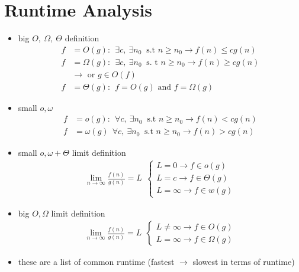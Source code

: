 \section*{Runtime Analysis} %
\begin{itemize}
    \item big $O,~ \Omega,~ \Theta$ definition 
    \begin{align*}
        f &= O(g):~~\exists c, ~ \exists n_0~\text{ s.t }  n \geq n_0 \rightarrow f(n) \leq cg(n)\\
        f &= \Omega(g):~~ \exists c, ~\exists n_0 ~ \text{ s. t } n \geq n_0 \rightarrow f(n) \geq c g(n)\\
        &\rightarrow \text{ or } g \in O(f) \\
        f &= \Theta(g): ~~ f = O(g) \text{ and } f = \Omega(g)
    \end{align*}
    \item small $o, \omega$
    \begin{align*}
        f &= o(g): ~~ \forall c, ~ \exists n_0 ~ \text{ s.t } n \geq n_0 \rightarrow f(n) < c g(n) \\
        f &= \omega(g) ~~ \forall c, ~ \exists n_0 ~ \text{ s.t } n \geq n_0 \rightarrow f(n) > c g(n)
    \end{align*}
    \item small $o, \omega + \Theta$ limit definition
    \begin{align*}
        \lim_{n \rightarrow \infty} \frac{f(n)}{g(n)} = L~~
        \begin{cases}
            L = 0 \rightarrow f \in o(g) \\
            L = c \rightarrow f \in \Theta(g) \\
            L = \infty \rightarrow f \in w(g)
        \end{cases}
    \end{align*}
    \item big $O, \Omega$ limit definition
    \begin{align*}
        \lim_{n \rightarrow \infty} \frac{f(n)}{g(n)} = L ~~
        \begin{cases}
            L \neq \infty \rightarrow f \in O(g) \\
            L = \infty \rightarrow f \in \Omega(g)
        \end{cases}
    \end{align*}
    
    \item these are a list of common runtime (fastest $\rightarrow$ slowest in terms of runtime) 
    \end{itemize}
